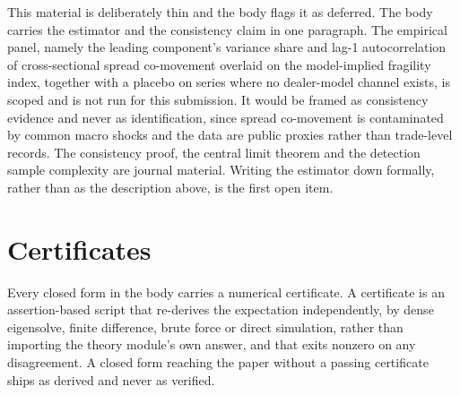 This material is deliberately thin and the body flags it as deferred. The body carries the estimator and the consistency claim in one paragraph. The empirical panel, namely the leading component's variance share and lag-1 autocorrelation of cross-sectional spread co-movement overlaid on the model-implied fragility index, together with a placebo on series where no dealer-model channel exists, is scoped and is not run for this submission. It would be framed as consistency evidence and never as identification, since spread co-movement is contaminated by common macro shocks and the data are public proxies rather than trade-level records. The consistency proof, the central limit theorem and the detection sample complexity are journal material. Writing the estimator down formally, rather than as the description above, is the first open item.

\section{Certificates}
\label{app:certificates}

Every closed form in the body carries a numerical certificate. A certificate is an assertion-based script that re-derives the expectation independently, by dense eigensolve, finite difference, brute force or direct simulation, rather than importing the theory module's own answer, and that exits nonzero on any disagreement. A closed form reaching the paper without a passing certificate ships as derived and never as verified.

